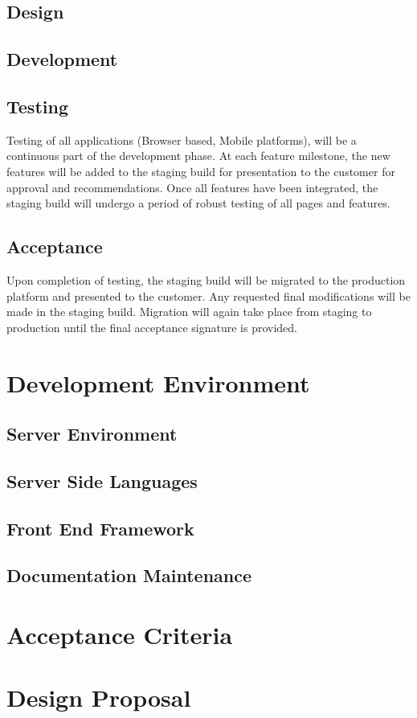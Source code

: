 \documentclass[dvips,12pt]{article}
\begin{document}
	\subsection{Design}
	
	
	\subsection{Development}
	
	\subsection{Testing}
	Testing of all applications (Browser based, Mobile platforms), will be a continuous part of the development phase. At each feature milestone, the new features will be added to the staging build for presentation to the customer for approval and recommendations. Once all features have been integrated, the staging build will undergo a period of robust testing of all pages and features. 

	\subsection{Acceptance}
	Upon completion of testing, the staging build will be migrated to the production platform and presented to the customer. Any requested final modifications will be made in the staging build. Migration will again take place from staging to production until the final acceptance signature is provided.
	
\section{Development Environment}
	\subsection{Server Environment}
	\subsection{Server Side Languages}
	\subsection{Front End Framework}
	\subsection{Documentation Maintenance}

\section{Acceptance Criteria}

\section{Design Proposal}
\end{document}
